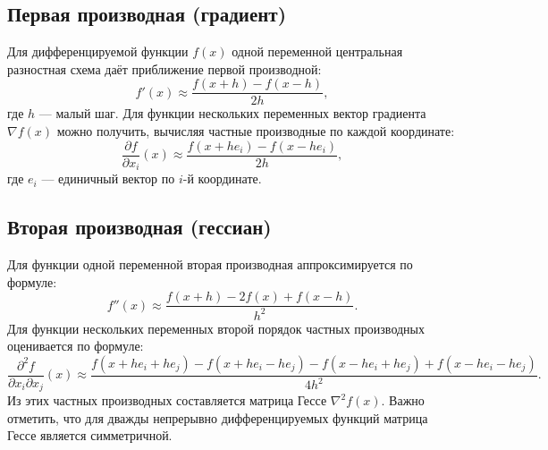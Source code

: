 \documentclass[a4paper,12pt]{article}
\begin{document}
\subsection{Первая производная (градиент)}
Для дифференцируемой функции \( f(x) \) одной переменной центральная разностная схема даёт приближение первой производной:
\[
f'(x) \approx \frac{f(x+h) - f(x-h)}{2h},
\]
где \( h \) --- малый шаг. Для функции нескольких переменных вектор градиента \( \nabla f(x) \) можно получить, вычисляя частные производные по каждой координате:
\[
\frac{\partial f}{\partial x_i}(x) \approx \frac{f(x+he_i) - f(x-he_i)}{2h},
\]
где \( e_i \) --- единичный вектор по \( i \)-й координате.

\subsection{Вторая производная (гессиан)}  
Для функции одной переменной вторая производная аппроксимируется по формуле:
\[
f''(x) \approx \frac{f(x+h)-2f(x)+f(x-h)}{h^2}.
\]
Для функции нескольких переменных второй порядок частных производных оценивается по формуле:
\[
\frac{\partial^2 f}{\partial x_i \partial x_j}(x) \approx \frac{f(x+he_i+he_j)-f(x+he_i-he_j)-f(x-he_i+he_j)+f(x-he_i-he_j)}{4h^2}.
\]
Из этих частных производных составляется матрица Гессе \( \nabla^2 f(x) \). Важно отметить, что для дважды непрерывно дифференцируемых функций матрица Гессе является симметричной.
\end{document}
